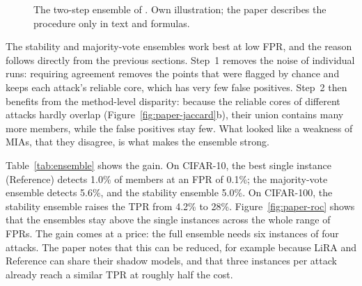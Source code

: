\documentclass[a4paper]{article}
\begin{document}
\begin{figure}[!htb]
  \centering
  \caption{The two-step ensemble of \citet{wang2025mia}. Own illustration; the paper describes the procedure only in text and formulas.}
  \label{fig:ensemble}
\end{figure}

The stability and majority-vote ensembles work best at low FPR, and the reason follows directly from the previous sections.
Step~1 removes the noise of individual runs: requiring agreement removes the points that were flagged by chance and keeps each attack's reliable core, which has very few false positives.
Step~2 then benefits from the method-level disparity: because the reliable cores of different attacks hardly overlap (Figure~\ref{fig:paper-jaccard}b), their union contains many more members, while the false positives stay few.
What looked like a weakness of MIAs, that they disagree, is what makes the ensemble strong.

Table~\ref{tab:ensemble} shows the gain.
On CIFAR-10, the best single instance (Reference) detects 1.0\% of members at an FPR of 0.1\%; the majority-vote ensemble detects 5.6\%, and the stability ensemble 5.0\%.
On CIFAR-100, the stability ensemble raises the TPR from 4.2\% to 28\%.
Figure~\ref{fig:paper-roc} shows that the ensembles stay above the single instances across the whole range of FPRs.
The gain comes at a price: the full ensemble needs six instances of four attacks.
The paper notes that this can be reduced, for example because LiRA and Reference can share their shadow models, and that three instances per attack already reach a similar TPR at roughly half the cost.
\end{document}
